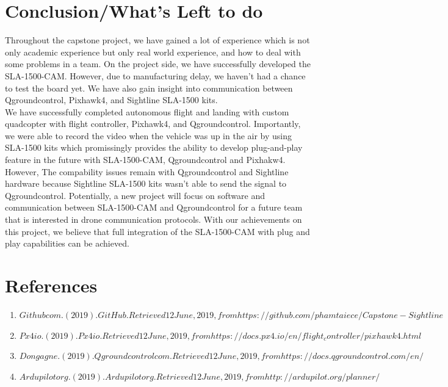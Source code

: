 \documentclass[11pt]{article}
\begin{document}
\section{Conclusion/What's Left to do}
Throughout the capstone project, we have gained a lot of experience which is not only academic experience but only real world experience, and how to deal with some problems in a team. On the project side, we have successfully developed the SLA-1500-CAM. However, due to manufacturing delay, we haven't had a chance to test the board yet. We have also gain insight into communication between Qgroundcontrol, Pixhawk4, and Sightline SLA-1500 kits. \\
We have successfully completed autonomous flight and landing with custom quadcopter with flight controller, Pixhawk4, and Qgroundcontrol. Importantly, we were able to record the video when the vehicle was up in the air by using SLA-1500 kits which promissingly provides the ability to develop plug-and-play feature in the future with SLA-1500-CAM, Qgroundcontrol and Pixhakw4. \\
However, The compability issues remain with Qgroundcontrol and Sightline hardware because Sightline SLA-1500 kits wasn't able to send the signal to Qgroundcontrol. Potentially, a new project will focus on software and communication between SLA-1500-CAM and Qgroundcontrol for a future team that is interested in drone communication protocols. With our achievements on this project, we believe that full integration of the SLA-1500-CAM with plug and play capabilities can be achieved.     


\pagebreak

\section{References}
\begin{enumerate}
\item $Githubcom. (2019). GitHub. Retrieved 12 June, 2019, from https://github.com/phamtaiece/Capstone-Sightline$

\item $Px4io. (2019). Px4io. Retrieved 12 June, 2019, from https://docs.px4.io/en/flight_controller/pixhawk4.html$

\item$ Don gagne. (2019). Qgroundcontrolcom. Retrieved 12 June, 2019, from https://docs.qgroundcontrol.com/en/$

\item $Ardupilotorg. (2019). Ardupilotorg. Retrieved 12 June, 2019, from http://ardupilot.org/planner/$

\end{enumerate}	
\end{document}
